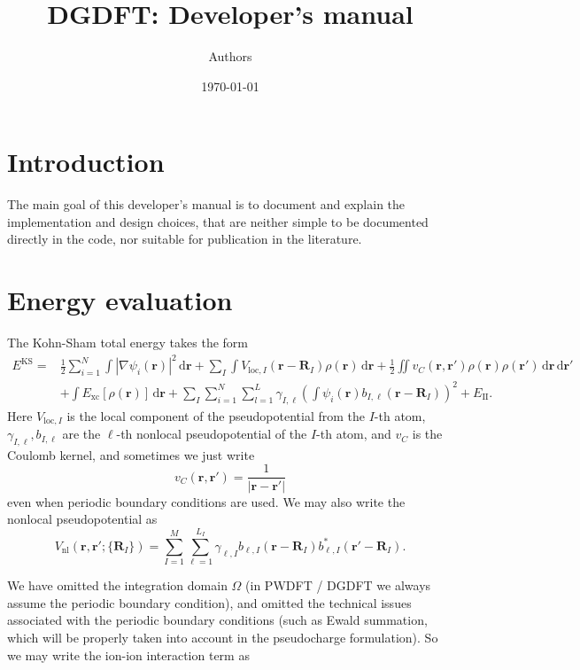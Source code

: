 \documentclass{article}
\newcommand{\bvec}[1]{\mathbf{#1}}
\newcommand{\vr}{\bvec{r}}
\newcommand{\vR}{\bvec{R}}
\newcommand{\ud}{\,\mathrm{d}}
\newcommand{\II}{\mathrm{II}}
\theoremstyle{plain}
\theoremstyle{remark}
\theoremstyle{plain}
\theoremstyle{plain}
\theoremstyle{plain}
\begin{document}
\title{DGDFT: Developer's manual}
\author{Authors}
\date{\today}
\maketitle


\section{Introduction}

The main goal of this developer's manual is to document and explain the implementation and design choices, that are neither simple to be documented directly in the code, nor suitable for publication in the literature.  

\section{Energy evaluation}

The Kohn-Sham total energy takes the form
\begin{equation}
    \begin{aligned}
    E^{\text{KS}}=& \frac{1}{2} \sum_{i=1}^{N} \int \left|\nabla \psi_{i}(\vr)\right|^{2} \ud \vr +\sum_{I} \int V_{\text{loc}, I}\left(\vr-\vR_{I}\right) \rho(\vr) \ud \vr +\frac{1}{2} \iint v_C(\vr,\vr')\rho(\vr) \rho(\vr') \ud \vr \ud \vr'\\
    &+\int E_{\text{xc}}[\rho(\vr)]\ud \vr+\sum_{I} \sum_{i=1}^{N} \sum_{l=1}^{L} \gamma_{I, \ell}\left(\int \psi_{i}(\vr) b_{I, \ell}\left(\vr-\vR_{I}\right)\right)^{2} +E_{\II}. 
    \end{aligned}
\label{eqn:KSEnergy}
\end{equation}
Here $V_{\text{loc},I}$ is the local component of the pseudopotential from the $I$-th atom, $\gamma_{I,\ell},b_{I,\ell}$ are the $\ell$-th nonlocal pseudopotential of the $I$-th atom, and $v_C$ is the Coulomb kernel, and sometimes we just write
\begin{equation}
v_C(\vr,\vr')=\frac{1}{|\vr-\vr'|}
\label{eqn:vC}
\end{equation}
even when periodic boundary conditions are used. 
We may also write the nonlocal pseudopotential as
\begin{equation}
V_{\text{nl}}(\vr,\vr';\{\vR_{I}\})=\sum_{I=1}^{M}\sum_{\ell=1}^{L_{I}} \gamma_{\ell,I}
  b_{\ell,I}(\vr-\vR_{I}) b_{\ell,I}^{*}(\vr'-\vR_{I}).
\label{eqn:nonlocal}
\end{equation}

We have omitted the integration domain $\Omega$ (in PWDFT / DGDFT we always assume the periodic boundary condition), and omitted the technical issues associated with the periodic boundary conditions (such as Ewald summation, which will be properly taken into account in the pseudocharge formulation). So we may write the ion-ion interaction term as
\end{document}
